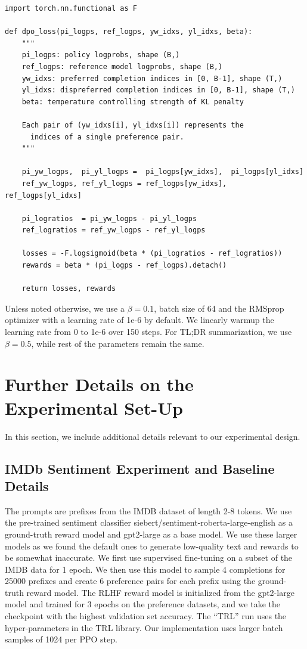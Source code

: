 \documentclass{article}
\begin{document}
\begin{verbatim}
import torch.nn.functional as F

def dpo_loss(pi_logps, ref_logps, yw_idxs, yl_idxs, beta):
    """
    pi_logps: policy logprobs, shape (B,)
    ref_logps: reference model logprobs, shape (B,)
    yw_idxs: preferred completion indices in [0, B-1], shape (T,)
    yl_idxs: dispreferred completion indices in [0, B-1], shape (T,)
    beta: temperature controlling strength of KL penalty

    Each pair of (yw_idxs[i], yl_idxs[i]) represents the
      indices of a single preference pair.
    """

    pi_yw_logps,  pi_yl_logps =  pi_logps[yw_idxs],  pi_logps[yl_idxs]
    ref_yw_logps, ref_yl_logps = ref_logps[yw_idxs], ref_logps[yl_idxs]

    pi_logratios  = pi_yw_logps - pi_yl_logps
    ref_logratios = ref_yw_logps - ref_yl_logps

    losses = -F.logsigmoid(beta * (pi_logratios - ref_logratios))
    rewards = beta * (pi_logps - ref_logps).detach()

    return losses, rewards
\end{verbatim}

Unless noted otherwise, we use a $\beta = 0.1$, batch size of 64 and the RMSprop optimizer with a learning rate of 1e-6 by default. We linearly warmup the learning rate from 0 to 1e-6 over 150 steps. For TL;DR summarization, we use $\beta=0.5$, while rest of the parameters remain the same.

\section{Further Details on the Experimental Set-Up}
\label{app:exp_details}
In this section, we include additional details relevant to our experimental design.
\subsection{IMDb Sentiment Experiment and Baseline Details}
\label{app:sentiment_details}
The prompts are prefixes from the IMDB dataset of length 2-8 tokens. We use the pre-trained sentiment classifier siebert/sentiment-roberta-large-english as a ground-truth reward model and gpt2-large as a base model. We use these larger models as we found the default ones to generate low-quality text and rewards to be somewhat inaccurate. We first use supervised fine-tuning on a subset of the IMDB data for 1 epoch. We then use this model to sample 4 completions for 25000 prefixes and create 6 preference pairs for each prefix using the ground-truth reward model. The RLHF reward model is initialized from the gpt2-large model and trained for 3 epochs on the preference datasets, and we take the checkpoint with the highest validation set accuracy. The ``TRL” run uses the hyper-parameters in the TRL library. Our implementation uses larger batch samples of 1024 per PPO step.
\end{document}
